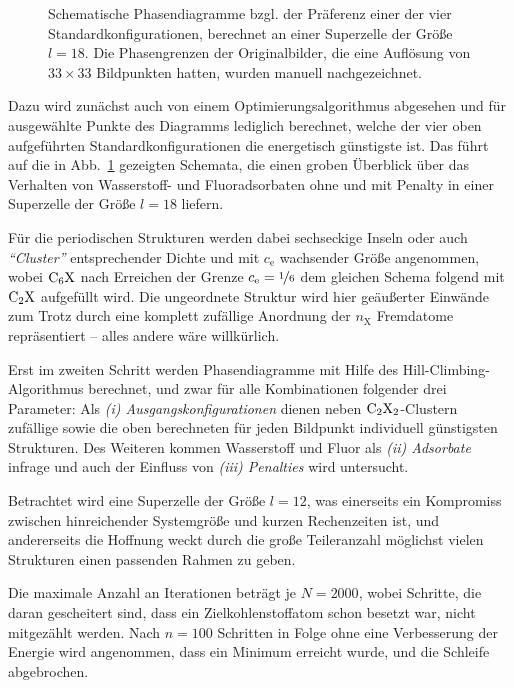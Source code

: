 \documentclass[a4paper, 10pt, twoside, openany]{book} %
\def \nX {n_\mathrm{X}}
\def \cE {c_\mathrm{e}}
\begin{document}
\begin{figure}
\begin{minipage}[b]{0.48\textwidth}
    \end{minipage}
    \caption[Präferenz einer der vier Standardkonfigurationen]{Schematische Phasendiagramme bzgl. der Präferenz einer der vier Standardkonfigurationen, berechnet an einer Superzelle der Größe $l = 18$. Die Phasengrenzen der Originalbilder, die eine Auflösung von $33 \times 33$ Bildpunkten hatten, wurden manuell nachgezeichnet.}
    \label{Schemata}
\end{figure}
%
Dazu wird zunächst auch von einem Optimierungsalgorithmus abgesehen und für ausgewählte Punkte des Diagramms lediglich berechnet, welche der vier oben aufgeführten Standardkonfigurationen die energetisch günstigste ist. Das führt auf die in Abb.~\ref{Schemata} gezeigten Schemata, die einen groben Überblick über das Verhalten von Wasserstoff- und Fluoradsorbaten ohne und mit Penalty in einer Superzelle der Größe $l = 18$ liefern.

Für die periodischen Strukturen werden dabei sechseckige Inseln oder auch \emph{"`Cluster"'} entsprechender Dichte und mit $\cE$ wachsender Größe angenommen, wobei $\rm C_6X$ nach Erreichen der Grenze $\cE = \nicefrac 1 6$ dem gleichen Schema folgend mit $\rm C_2X$ aufgefüllt wird. Die ungeordnete Struktur wird hier geäußerter Einwände zum Trotz durch eine komplett zufällige Anordnung der $\nX$ Fremdatome repräsentiert -- alles andere wäre willkürlich.

Erst im zweiten Schritt werden Phasendiagramme mit Hilfe des Hill-Climbing-Algorithmus berechnet, und zwar für alle Kombinationen folgender drei Parameter: Als \emph{(i) Ausgangskonfigurationen} dienen neben $\rm C_2X_2$-Clustern zufällige sowie die oben berechneten für jeden Bildpunkt individuell günstigsten Strukturen. Des Weiteren kommen Wasserstoff und Fluor als \emph{(ii) Adsorbate} infrage und auch der Einfluss von \emph{(iii) Penalties} wird untersucht.

Betrachtet wird eine Superzelle der Größe $l = 12$, was einerseits ein Kompromiss zwischen hinreichender Systemgröße und kurzen Rechenzeiten ist, und andererseits die Hoffnung weckt durch die große Teileranzahl möglichst vielen Strukturen einen passenden Rahmen zu geben.

Die maximale Anzahl an Iterationen beträgt je $N = 2000$, wobei Schritte, die daran gescheitert sind, dass ein Zielkohlenstoffatom schon besetzt war, nicht mitgezählt werden. Nach $n = 100$ Schritten in Folge ohne eine Verbesserung der Energie wird angenommen, dass ein Minimum erreicht wurde, und die Schleife abgebrochen.
\end{document}
